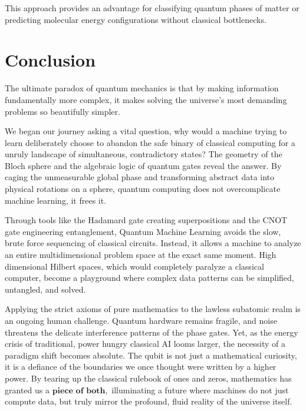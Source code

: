 \documentclass[12pt]{article}
\begin{document}
This approach provides an advantage for classifying quantum phases of matter or predicting molecular energy configurations without classical bottlenecks.

\section{Conclusion}

The ultimate paradox of quantum mechanics is that by making information fundamentally more 
complex, it makes solving the universe's most demanding problems so beautifully simpler. 
\vspace{0.3cm}

We began our journey asking a vital question, why would a machine trying to learn deliberately choose to abandon the safe binary of classical computing for a unruly landscape of simultaneous, contradictory states? The geometry of the Bloch sphere and the algebraic logic of quantum gates reveal the answer. By caging the unmeasurable global phase and transforming abstract data into physical rotations on a sphere, quantum computing does not 
\vspace{0.3cm}
overcomplicate machine learning, it frees it.

Through tools like the Hadamard gate creating superpositions and the CNOT gate engineering entanglement, Quantum Machine Learning avoids the slow, brute force sequencing of classical circuits. Instead, it allows a machine to analyze an entire multidimensional problem space at the exact same moment. High dimensional Hilbert spaces, which would completely paralyze a classical computer, become a playground where complex data patterns can be simplified,
\vspace{0.3cm}
untangled, and solved. 

Applying the strict axioms of pure mathematics to the lawless subatomic realm is an ongoing human challenge. Quantum hardware remains fragile, and noise threatens the delicate interference patterns of the phase gates. Yet, as the energy crisis of traditional, power hungry classical AI looms larger, the necessity of a paradigm shift becomes absolute. The qubit is not just a mathematical curiosity, it is a defiance of the boundaries we once thought were written by a higher power. By tearing up the classical rulebook of ones and zeros, mathematics has granted us a \(\textbf{piece of both},\) illuminating a future where machines do not just compute data, but truly mirror the profound, fluid reality of the universe itself.
\end{document}
